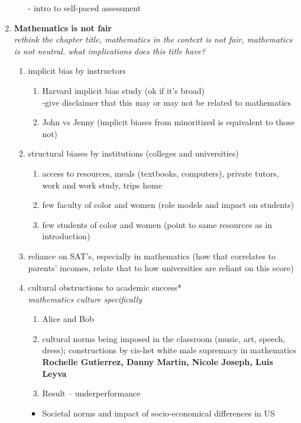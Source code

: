 \begin{enumerate}
\begin{enumerate}
      - intro to self-paced assessment
  \end{enumerate}
  \item {\bf Mathematics is not fair }\\
  {\it rethink the chapter title, mathematics in the context is not fair, mathematics is not neutral. what implications does this title have?}
  \begin{enumerate}
    \item implicit bias by instructors
    \begin{enumerate}
      \item Harvard implicit bias study (ok if it's broad)\\
      -give disclaimer that this may or may not be related to mathematics
      \item John vs Jenny (implicit biases from minoritized is equivalent to those not)
    \end{enumerate}
    \item structural biases by institutions (colleges and universities)
    \begin{enumerate}
      \item access to resources, meals (textbooks, computers), private tutors, work and work study, trips home
      \item few faculty of color and women (role models and impact on students)
      \item few students of color and women (point to same resources as in introduction)
    \end{enumerate}
    \item reliance on SAT's, especially in mathematics (how that correlates to parents' incomes, relate that to how universities are reliant on this score)
    \item cultural obstructions to academic success*\\
    {\it mathematics culture specifically}
    \begin{enumerate}
      \item Alice and Bob
      \item cultural norms being imposed in the classroom (music, art, speech, dress); constructions by cis-het white male supremacy in mathematics {\bf Rochelle Gutierrez, Danny Martin, Nicole Joseph, Luis Leyva}
      \item Result -- underperformance
    \end{enumerate}
    \begin{itemize}
          \item Societal norms and impact of socio-economical differences in US\\

\end{itemize}
\end{enumerate}
\end{enumerate}
